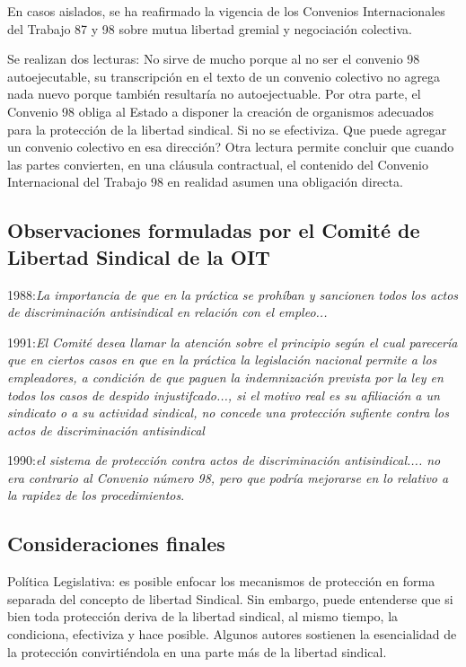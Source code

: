 \documentclass[spanish,12pt,a4paper,titlepage]{report}
\begin{document}
En casos aislados, se ha reafirmado la vigencia de los Convenios Internacionales del Trabajo 87 y 98 sobre mutua libertad gremial y negociación colectiva.

Se realizan dos lecturas: No sirve de mucho porque al no ser el convenio 98 autoejecutable, su transcripción en el texto de un convenio colectivo no agrega nada nuevo porque también resultaría no autoejectuable. Por otra parte, el Convenio 98 obliga al Estado a disponer la creación de organismos adecuados para la protección de la libertad sindical. Si no se efectiviza. Que puede agregar un convenio colectivo en esa dirección? Otra lectura permite concluir que cuando las partes convierten, en una cláusula contractual, el contenido del Convenio Internacional del Trabajo 98 en realidad asumen una obligación directa.

\subsection{Observaciones formuladas por el Comité de Libertad Sindical de la OIT}

1988:\textit{La importancia de que en la práctica se prohíban y sancionen todos los actos de discriminación antisindical en relación con el empleo...}

1991:\textit{El Comité desea llamar la atención sobre el principio según el cual parecería que en ciertos casos en que en la práctica la legislación nacional permite a los empleadores, a condición de que paguen la indemnización prevista por la ley en todos los casos de despido injustifcado..., si el motivo real es su afiliación a un sindicato o a su actividad sindical, no concede una protección sufiente contra los actos de discriminación antisindical}

1990:\textit{el sistema de protección contra actos de discriminación antisindical.... no era contrario al Convenio número 98, pero que podría mejorarse en lo relativo a la rapidez de los procedimientos}.

\subsection{Consideraciones finales}

Política Legislativa: es posible enfocar los mecanismos de protección en forma separada del concepto de libertad Sindical. Sin embargo, puede entenderse que si bien toda protección deriva de la libertad sindical, al mismo tiempo, la condiciona, efectiviza y hace posible. Algunos autores sostienen la esencialidad de la protección convirtiéndola en una parte más de la libertad sindical.
\end{document}

